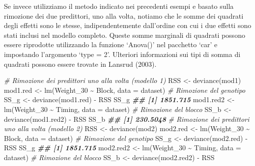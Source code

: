 \documentclass[
  12pt,
]{book}
\newenvironment{Shaded}{\begin{snugshade}}{\end{snugshade}}
\newcommand{\AttributeTok}[1]{\textcolor[rgb]{0.77,0.63,0.00}{#1}}
\newcommand{\CommentTok}[1]{\textcolor[rgb]{0.56,0.35,0.01}{\textit{#1}}}
\newcommand{\DocumentationTok}[1]{\textcolor[rgb]{0.56,0.35,0.01}{\textbf{\textit{#1}}}}
\newcommand{\FunctionTok}[1]{\textcolor[rgb]{0.00,0.00,0.00}{#1}}
\newcommand{\NormalTok}[1]{#1}
\newcommand{\OtherTok}[1]{\textcolor[rgb]{0.56,0.35,0.01}{#1}}
\newcommand{\SpecialCharTok}[1]{\textcolor[rgb]{0.00,0.00,0.00}{#1}}
\begin{document}
Se invece utilizziamo il metodo indicato nei precedenti esempi e basato sulla rimozione dei due predittori, uno alla volta, notiamo che le somme dei quadrati degli effetti sono le stesse, indipendentemente dall'ordine con cui i due effetti sono stati inclusi nel modello completo. Queste somme marginali di quadrati possono essere riprodotte utilizzando la funzione `Anova()' nel pacchetto `car' e impostando l'argomento `type = 2'. Ulteriori informazioni sui tipi di somma di quadrati possono essere trovate in Lansrud (2003).

\begin{Shaded}
\begin{Highlighting}[]
\CommentTok{\# Rimozione dei predittori uno alla volta (modello 1)}
\NormalTok{RSS }\OtherTok{\textless{}{-}} \FunctionTok{deviance}\NormalTok{(mod1)}
\NormalTok{mod1.red }\OtherTok{\textless{}{-}} \FunctionTok{lm}\NormalTok{(Weight\_30 }\SpecialCharTok{\textasciitilde{}}\NormalTok{ Block,}
               \AttributeTok{data =}\NormalTok{ dataset) }\CommentTok{\# Rimozione del genotipo}
\NormalTok{SS\_g }\OtherTok{\textless{}{-}} \FunctionTok{deviance}\NormalTok{(mod1.red) }\SpecialCharTok{{-}}\NormalTok{ RSS}
\NormalTok{SS\_g}
\DocumentationTok{\#\# [1] 1851.715}
\NormalTok{mod1.red2 }\OtherTok{\textless{}{-}} \FunctionTok{lm}\NormalTok{(Weight\_30 }\SpecialCharTok{\textasciitilde{}}\NormalTok{ Timing,}
                \AttributeTok{data =}\NormalTok{ dataset) }\CommentTok{\# Rimozione del blocco}
\NormalTok{SS\_b }\OtherTok{\textless{}{-}} \FunctionTok{deviance}\NormalTok{(mod1.red2) }\SpecialCharTok{{-}}\NormalTok{ RSS}
\NormalTok{SS\_b}
\DocumentationTok{\#\# [1] 230.5048}
\CommentTok{\# Rimozione dei predittori uno alla volta (modello 2)}
\NormalTok{RSS }\OtherTok{\textless{}{-}} \FunctionTok{deviance}\NormalTok{(mod2)}
\NormalTok{mod2.red }\OtherTok{\textless{}{-}} \FunctionTok{lm}\NormalTok{(Weight\_30 }\SpecialCharTok{\textasciitilde{}}\NormalTok{ Block,}
               \AttributeTok{data =}\NormalTok{ dataset) }\CommentTok{\# Rimozione del genotipo}
\NormalTok{SS\_g }\OtherTok{\textless{}{-}} \FunctionTok{deviance}\NormalTok{(mod2.red) }\SpecialCharTok{{-}}\NormalTok{ RSS}
\NormalTok{SS\_g}
\DocumentationTok{\#\# [1] 1851.715}
\NormalTok{mod2.red2 }\OtherTok{\textless{}{-}} \FunctionTok{lm}\NormalTok{(Weight\_30 }\SpecialCharTok{\textasciitilde{}}\NormalTok{ Timing,}
                \AttributeTok{data =}\NormalTok{ dataset) }\CommentTok{\# Rimozione del blocco}
\NormalTok{SS\_b }\OtherTok{\textless{}{-}} \FunctionTok{deviance}\NormalTok{(mod2.red2) }\SpecialCharTok{{-}}\NormalTok{ RSS}

\end{Highlighting}
\end{Shaded}
\end{document}
